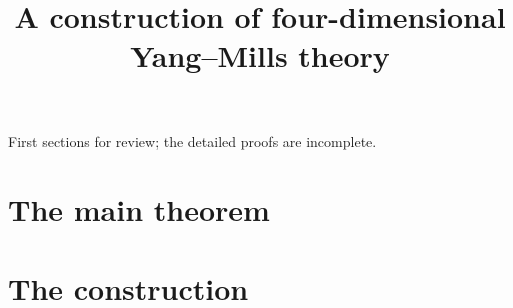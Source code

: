 \documentclass[11pt,letterpaper]{article}
\title{A construction of four-dimensional Yang--Mills theory}
\author{}
\date{}
\numberwithin{equation}{section}
\theoremstyle{plain}
\theoremstyle{definition}
\theoremstyle{remark}
\begin{document}
\maketitle
\begin{center}\small First sections for review; the detailed proofs are incomplete.\end{center}
\tableofcontents
\clearpage
\part{The main theorem}\label{part:main}






\clearpage
\part{The construction}\label{part:construction}
















\end{document}
